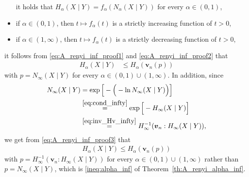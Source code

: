 \documentclass[conference, draftcls, onecolumn]{IEEEtran}
\theoremstyle{plain}
\newcommand{\bvec}[1]{\boldsymbol{#1}}
\newcommand{\thref}[1]{Theorem~\ref{#1}}
\begin{document}
\begin{IEEEproof}[Proof of \thref{th:A_renyi_alpha_inf}]
\begin{itemize}
it holds that $H_{\alpha}(X \mid Y) = f_{\alpha}( N_{\alpha}(X \mid Y) )$ for every $\alpha \in (0, 1)$,
\item
if $\alpha \in (0, 1)$, then $t \mapsto f_{\alpha}( t )$ is a strictly increasing function of $t > 0$,
\item
if $\alpha \in (1, \infty)$, then $t \mapsto f_{\alpha}( t )$ is a strictly decreasing function of $t > 0$,
\end{itemize}
it follows from \eqref{eq:A_renyi_inf_proof1} and \eqref{eq:A_renyi_inf_proof2} that
\begin{align}
H_{\alpha}(X \mid Y)
& \le
H_{\alpha}( \bvec{v}_{n}( p ) )
\label{eq:A_renyi_inf_proof3}
\end{align}
with $p = N_{\infty}(X \mid Y)$ for every $\alpha \in (0, 1) \cup (1, \infty)$.
In addition, since
\begin{align}
N_{\infty}(X \mid Y)
& =
\exp\Big[ - \Big( - \ln N_{\infty}(X \mid Y) \Big) \Big]
\\
& \overset{\eqref{eq:cond_infty}}{=}
\exp\Big[ - H_{\infty}(X \mid Y) \Big]
\\
& \overset{\eqref{eq:inv_Hv_infty}}{=}
H_{\infty}^{-1}( \bvec{v}_{n} : H_{\infty}(X \mid Y) ) ,
\end{align}
we get from \eqref{eq:A_renyi_inf_proof3} that
\begin{align}
H_{\alpha}(X \mid Y)
\le
H_{\alpha}( \bvec{v}_{n}( p ) )
\end{align}
with $p = H_{\infty}^{-1}( \bvec{v}_{n} : H_{\infty}(X \mid Y) )$ for every $\alpha \in (0, 1) \cup (1, \infty)$ rather than $p = N_{\infty}(X \mid Y)$, which is \eqref{ineq:alpha_inf} of \thref{th:A_renyi_alpha_inf}.




\end{IEEEproof}
\end{document}
